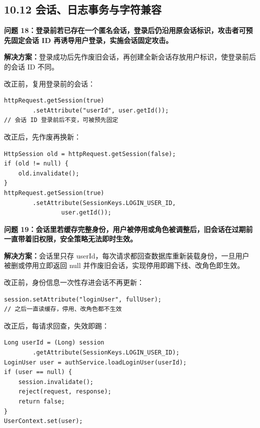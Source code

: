 \documentclass[zihao=-4,UTF8,openany]{ctexart}
\renewcommand{\_}{\textunderscore\allowbreak}
\begin{document}
\subsection*{\texorpdfstring{\textbf{10.12 会话、日志事务与字符兼容}}{10.12 会话、日志事务与字符兼容}}\label{ux4f1aux8bddux4e8eux517cux5bb9}

\noindent\textbf{问题 18：登录前若已存在一个匿名会话，登录后仍沿用原会话标识，攻击者可预先固定会话 ID 再诱导用户登录，实施会话固定攻击。}

\textbf{解决方案：}登录成功后先作废旧会话，再创建全新会话存放用户标识，使登录前后的会话 ID 不同。

改正前，复用登录前的会话：

\begin{lstlisting}
httpRequest.getSession(true)
        .setAttribute("userId", user.getId());
// 会话 ID 登录前后不变，可被预先固定
\end{lstlisting}

改正后，先作废再换新：

\begin{lstlisting}
HttpSession old = httpRequest.getSession(false);
if (old != null) {
    old.invalidate();
}
httpRequest.getSession(true)
        .setAttribute(SessionKeys.LOGIN_USER_ID,
                user.getId());
\end{lstlisting}

\noindent\textbf{问题 19：会话里若缓存完整身份，用户被停用或角色被调整后，旧会话在过期前一直带着旧权限，安全策略无法即时生效。}

\textbf{解决方案：}会话里只存 userId，每次请求都回查数据库重新装载身份，一旦用户被删或停用立即返回 null 并作废旧会话，实现停用即踢下线、改角色即生效。

改正前，身份信息一次性存进会话不再更新：

\begin{lstlisting}
session.setAttribute("loginUser", fullUser);
// 之后一直读缓存，停用、改角色都不生效
\end{lstlisting}

改正后，每请求回查，失效即踢：

\begin{lstlisting}
Long userId = (Long) session
        .getAttribute(SessionKeys.LOGIN_USER_ID);
LoginUser user = authService.loadLoginUser(userId);
if (user == null) {
    session.invalidate();
    reject(request, response);
    return false;
}
UserContext.set(user);
\end{lstlisting}
\end{document}
